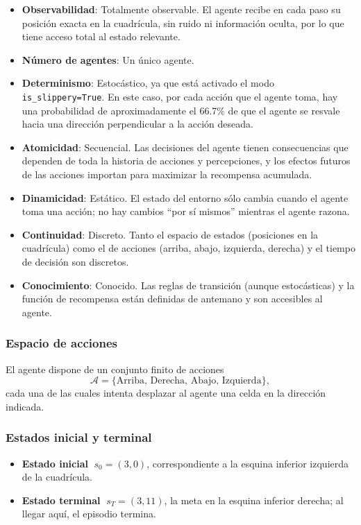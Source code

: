 \begin{itemize}
    \item \textbf{Observabilidad}: Totalmente observable. El agente recibe en cada paso su posición exacta en la cuadrícula, sin ruido ni información oculta, por lo que tiene acceso total al estado relevante.
    \item \textbf{Número de agentes}: Un único agente.
    \item \textbf{Determinismo}: Estocástico, ya que está activado el modo \texttt{is\_slippery=True}. En este caso, por cada acción que el agente toma, hay una probabilidad de aproximadamente el 66.7\% de que el agente se resvale hacia una dirección perpendicular a la acción deseada.
    \item \textbf{Atomicidad}: Secuencial. Las decisiones del agente tienen consecuencias que dependen de toda la historia de acciones y percepciones, y los efectos futuros de las acciones importan para maximizar la recompensa acumulada.
    \item \textbf{Dinamicidad}: Estático. El estado del entorno sólo cambia cuando el agente toma una acción; no hay cambios “por sí mismos” mientras el agente razona.
    \item \textbf{Continuidad}: Discreto. Tanto el espacio de estados (posiciones en la cuadrícula) como el de acciones (arriba, abajo, izquierda, derecha) y el tiempo de decisión son discretos.
    \item \textbf{Conocimiento}: Conocido. Las reglas de transición (aunque estocásticas) y la función de recompensa están definidas de antemano y son accesibles al agente.
\end{itemize}

\subsubsection{Espacio de acciones}

El agente dispone de un conjunto finito de acciones
\[
  \mathcal{A} = \{\text{Arriba},\, \text{Derecha},\, \text{Abajo},\, \text{Izquierda}\},
\]
cada una de las cuales intenta desplazar al agente una celda en la dirección indicada.

\subsubsection{Estados inicial y terminal}
\begin{itemize}
  \item \textbf{Estado inicial} $\;s_0=(3,0)$, correspondiente a la esquina inferior izquierda de la cuadrícula.
  \item \textbf{Estado terminal} $\;s_T=(3,11)$, la meta en la esquina inferior derecha; al llegar aquí, el episodio termina.
\end{itemize}

